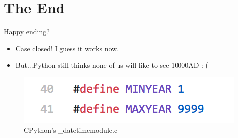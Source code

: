 \documentclass[10pt]{beamer}
\begin{document}
\section{The End}
\begin{frame}{Happy ending?}
	\begin{itemize}
		\item Case closed! I guess it works now.
		\item But...Python still thinks none of us will like to see 10000AD :-(
	\end{itemize}
	\begin{figure}
		\includegraphics[width=\textwidth]{images/eol.png}
		\caption{CPython's \_datetimemodule.c}
	\end{figure}
\end{frame}
\end{document}
